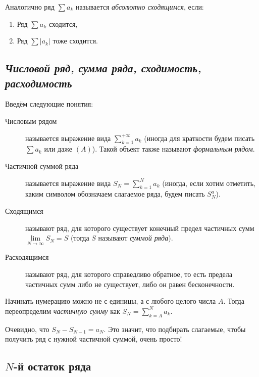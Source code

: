 \begin{ndefinition}
	Аналогично ряд \(\sum a_k\) называется \textit{абсолютно сходящимся}, если:
	\begin{enumerate}
		\item Ряд \(\sum a_k\) сходится,
		\item Ряд \(\sum |a_k|\) тоже сходится.
	\end{enumerate}
\end{ndefinition}

\subsection{\itshape Числовой ряд, сумма ряда, сходимость, расходимость}

\begin{definition}
	Введём следующие понятия:
	\begin{description}
		\item[Числовым рядом] называется выражение вида \(\sum\limits_{k=1}^{+\infty} a_k\) (иногда для краткости будем писать \(\sum a_k\) или даже \((A)\)). Такой объект также называют \textit{формальным рядом}.
		\item[Частичной суммой ряда] называется выражение вида \(S_N = \sum\limits_{k=1}^{N} a_k\) (иногда, если хотим отметить, каким символом обозначаем слагаемое ряда, будем писать \(S_N^a\)).
		\item[Сходящимся] называют ряд, для которого существует конечный предел частичных сумм \(\lim\limits_{N \to \infty} S_N = S\) (тогда \(S\) называют \textit{суммой ряда}).
		\item[Расходящимся] называют ряд, для которого справедливо обратное, то есть предела частичных сумм либо не существует, либо он равен бесконечности.
	\end{description}
\end{definition}

\begin{nremark}
	Начинать нумерацию можно не с единицы, а с любого целого числа \(A\). Тогда переопределим \textit{частичную сумму} как \(S_N = \sum\limits_{k=A}^{N} a_k\).
\end{nremark}

\begin{nremark}
	Очевидно, что \(S_N - S_{N-1} = a_N\). Это значит, что подбирать слагаемые, чтобы получить ряд с нужной частичной суммой, очень просто!
\end{nremark}

\subsection{\(N\)-й остаток ряда}

